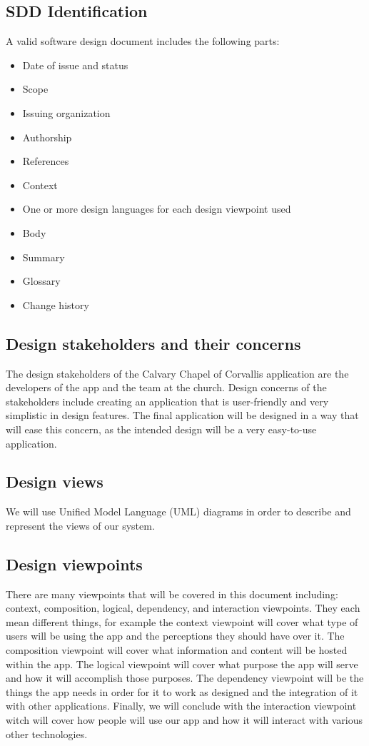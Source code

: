 \documentclass[letterpaper,10pt,draftclsnofoot,onecolumn,titlepage]{IEEEtran}
\begin{document}
		\subsection{SDD Identification}
			A valid software design document includes the following parts:
			\begin{itemize}
				\item{Date of issue and status}
				\item{Scope}
				\item{Issuing organization}
				\item{Authorship}
				\item{References}
				\item{Context}
				\item{One or more design languages for each design viewpoint used}
				\item{Body}
				\item{Summary}
				\item{Glossary}
				\item{Change history}
			\end{itemize}

		\subsection{Design stakeholders and their concerns}
			The design stakeholders of the Calvary Chapel of Corvallis application are the developers of the app and the team at the church.
			Design concerns of the stakeholders include creating an application that is user-friendly and very simplistic in design features.
			The final application will be designed in a way that will ease this concern, as the intended design will be a very easy-to-use application.

		\subsection{Design views}
		We will use Unified Model Language (UML) diagrams in order to describe and represent the views of our system.

		\subsection{Design viewpoints}
		There are many viewpoints that will be covered in this document including: context, composition, logical, dependency, and interaction viewpoints.
		They each mean different things, for example the context viewpoint will cover what type of users will be using the app and the perceptions they should have over it.
		The composition viewpoint will cover what information and content will be hosted within the app.
		The logical viewpoint will cover what purpose the app will serve and how it will accomplish those purposes.
		The dependency viewpoint will be the things the app needs in order for it to work as designed and the integration of it with other applications.
		Finally, we will conclude with the interaction viewpoint witch will cover how people will use our app and how it will interact with various other technologies.
\end{document}
